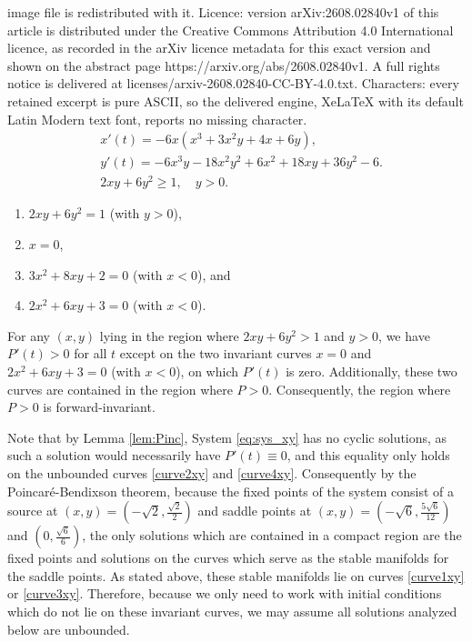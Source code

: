 \documentclass[10pt,a4paper]{amsart}
\begin{document}
image file is redistributed with it. Licence: version arXiv:2608.02840v1 of this article is distributed under the Creative Commons Attribution 4.0 International licence, as recorded in the arXiv licence metadata for this exact version and shown on the abstract page https://arxiv.org/abs/2608.02840v1. A full rights notice is delivered at licenses/arxiv-2608.02840-CC-BY-4.0.txt. Characters: every retained excerpt is pure ASCII, so the delivered engine, XeLaTeX with its default Latin Modern text font, reports no missing character.
    \begin{equation}\label{eq:sys_xy}
    \begin{aligned} 
        &
        x'(t) = -6x\left(x^3 + 3x^2 y + 4x + 6y\right), \\
        &
        y'(t) = -6x^3 y - 18x^2 y^2 + 6x^2 + 18x y + 36y^2 - 6. \\
        &
        2xy+6y^2\geq 1, \quad y>0  .
    \end{aligned}
    \end{equation}

    \begin{enumerate}
        \item \label{curve1xy} $2xy + 6y^2 = 1$ (with $y>0$),
        \item \label{curve2xy} $x=0$,
        \item \label{curve3xy} $3x^2 + 8xy + 2 = 0$ (with $x<0$), and %
        \item \label{curve4xy} $2x^2 + 6xy + 3 = 0$ (with $x<0$). %
    \end{enumerate}

    \begin{lemma}
        \label{lem:Pinc}
        For any $(x,y)$ lying in the region where $2xy+6y^2>1$ and $y>0$, we have $P'(t)>0$ for all $t$ except on the two invariant curves $x=0$ and $2x^2+6xy+3=0$ (with $x<0$), on which $P'(t)$ is zero. 
        Additionally, these two curves are contained in the region where $P>0$.
        Consequently, the region where $P>0$ is forward-invariant.
    \end{lemma}

    \begin{remark}\label{rem:compact}
        Note that by Lemma \ref{lem:Pinc}, System \eqref{eq:sys_xy} has no cyclic solutions, as such a solution would necessarily have $P'(t) \equiv 0$, and this equality only holds on the unbounded curves \eqref{curve2xy} and \eqref{curve4xy}.
        Consequently by the Poincar\'e-Bendixson theorem, because the fixed points of the system consist of a source at $(x,y)=(-\sqrt{2},\frac{\sqrt{2}}{2})$ and saddle points at $(x,y)=(-\sqrt{6},\frac{5\sqrt{6}}{12})$ and $(0,\frac{\sqrt{6}}{6})$, the only solutions which are contained in a compact region are the fixed points and solutions on the curves which serve as the stable manifolds for the saddle points.
        As stated above, these stable manifolds lie on curves \eqref{curve1xy} or \eqref{curve3xy}.
        Therefore, because we only need to work with initial conditions which do not lie on these invariant curves, we may assume all solutions analyzed below are unbounded.
    \end{remark}
\end{document}
